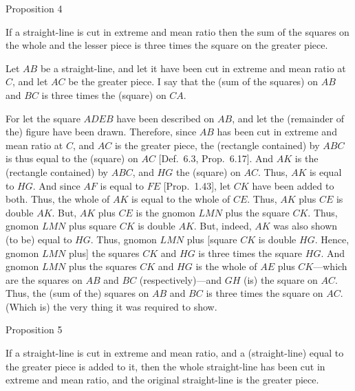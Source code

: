 
\begin{center}
{\large Proposition 4}
\end{center}

If a straight-line is cut in extreme and mean ratio then the sum of the
squares on the whole and the lesser piece is three times the square on
the greater piece.\\

\epsfysize=2.5in
\centerline{}

Let $AB$ be a straight-line, and let it have been cut in extreme and mean
ratio at $C$, and let $AC$ be the greater piece. I say that the (sum of the
squares) on $AB$ and $BC$ is three times the (square) on $CA$.

For let the square $ADEB$ have been described on $AB$, and
let the (remainder of the) figure have been drawn. Therefore, since
$AB$ has been cut in extreme and mean ratio at $C$,  and $AC$ is the greater piece, the (rectangle contained) by $ABC$ is thus equal to the
(square) on $AC$ [Def.~6.3, Prop.~6.17]. And $AK$ is the (rectangle
contained) by $ABC$, and $HG$ the (square) on $AC$. Thus,
$AK$ is equal to $HG$.  And since $AF$ is equal to $FE$ [Prop.~1.43],
let $CK$ have been added to both. Thus, the whole of $AK$  is equal to
the whole of $CE$. Thus, $AK$ plus $CE$ is double $AK$. But, $AK$
plus $CE$ is the gnomon $LMN$ plus the square $CK$. Thus, 
gnomon $LMN$ plus square $CK$ is double $AK$. But, indeed,
$AK$ was also shown (to be) equal to $HG$. Thus, gnomon $LMN$
plus [square $CK$ is double $HG$. Hence, gnomon $LMN$ plus] the
 squares $CK$ and $HG$ is three times the square $HG$.
And  gnomon $LMN$ plus the  squares  $CK$ and
$HG$ is the whole of $AE$ plus $CK$---which are the 
squares on $AB$ and $BC$ (respectively)---and $GH$ (is) the square on $AC$. 
Thus, the (sum of the) squares on $AB$ and $BC$ is three times the
square on $AC$. (Which is) the very thing it was required to show.


\begin{center}
{\large Proposition 5}
\end{center}

If a straight-line is cut in extreme and mean ratio, and a
(straight-line) equal to the greater piece is added to it, then the
whole straight-line has been cut in extreme and mean ratio, and
 the original straight-line is the greater piece.

